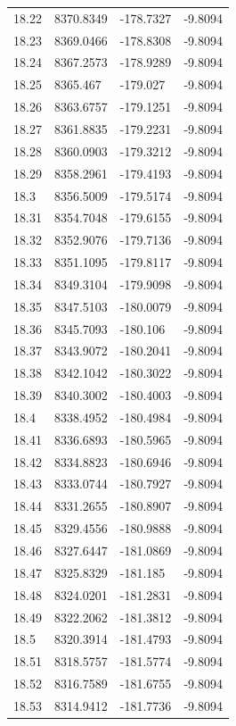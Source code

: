 \begin{table}[H]
\begin{tabular}{llll}
18.22 & 8370.8349 & -178.7327 & -9.8094 \\
18.23 & 8369.0466 & -178.8308 & -9.8094 \\
18.24 & 8367.2573 & -178.9289 & -9.8094 \\
18.25 & 8365.467 & -179.027 & -9.8094 \\
18.26 & 8363.6757 & -179.1251 & -9.8094 \\
18.27 & 8361.8835 & -179.2231 & -9.8094 \\
18.28 & 8360.0903 & -179.3212 & -9.8094 \\
18.29 & 8358.2961 & -179.4193 & -9.8094 \\
18.3 & 8356.5009 & -179.5174 & -9.8094 \\
18.31 & 8354.7048 & -179.6155 & -9.8094 \\
18.32 & 8352.9076 & -179.7136 & -9.8094 \\
18.33 & 8351.1095 & -179.8117 & -9.8094 \\
18.34 & 8349.3104 & -179.9098 & -9.8094 \\
18.35 & 8347.5103 & -180.0079 & -9.8094 \\
18.36 & 8345.7093 & -180.106 & -9.8094 \\
18.37 & 8343.9072 & -180.2041 & -9.8094 \\
18.38 & 8342.1042 & -180.3022 & -9.8094 \\
18.39 & 8340.3002 & -180.4003 & -9.8094 \\
18.4 & 8338.4952 & -180.4984 & -9.8094 \\
18.41 & 8336.6893 & -180.5965 & -9.8094 \\
18.42 & 8334.8823 & -180.6946 & -9.8094 \\
18.43 & 8333.0744 & -180.7927 & -9.8094 \\
18.44 & 8331.2655 & -180.8907 & -9.8094 \\
18.45 & 8329.4556 & -180.9888 & -9.8094 \\
18.46 & 8327.6447 & -181.0869 & -9.8094 \\
18.47 & 8325.8329 & -181.185 & -9.8094 \\
18.48 & 8324.0201 & -181.2831 & -9.8094 \\
18.49 & 8322.2062 & -181.3812 & -9.8094 \\
18.5 & 8320.3914 & -181.4793 & -9.8094 \\
18.51 & 8318.5757 & -181.5774 & -9.8094 \\
18.52 & 8316.7589 & -181.6755 & -9.8094 \\
18.53 & 8314.9412 & -181.7736 & -9.8094 \\

\end{tabular}
\end{table}

